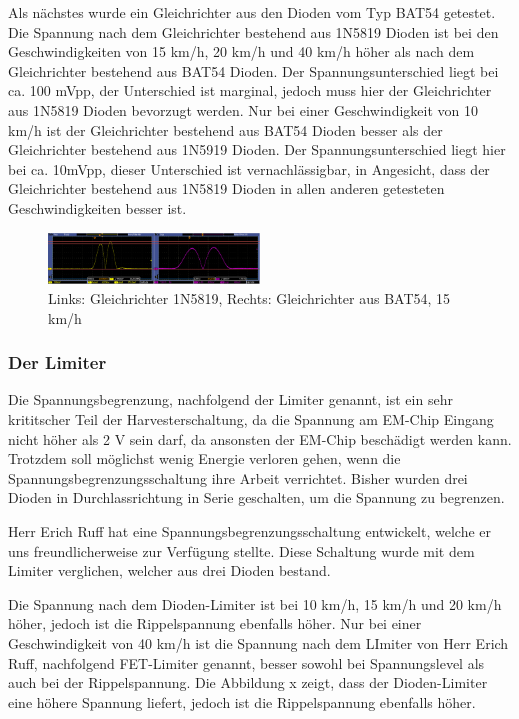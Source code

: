 Als nächstes wurde ein Gleichrichter aus den Dioden vom Typ BAT54 getestet. Die Spannung nach dem Gleichrichter bestehend aus 1N5819 Dioden ist bei den Geschwindigkeiten von 15 km/h, 20 km/h und 40 km/h höher als nach dem Gleichrichter bestehend aus BAT54 Dioden. Der Spannungsunterschied liegt bei ca. 100 mVpp, der Unterschied ist marginal, jedoch muss hier der Gleichrichter aus 1N5819 Dioden bevorzugt werden. Nur bei einer Geschwindigkeit von 10 km/h ist der Gleichrichter bestehend aus BAT54 Dioden besser als der Gleichrichter bestehend aus 1N5919 Dioden. Der Spannungsunterschied liegt hier bei ca. 10mVpp, dieser Unterschied ist vernachlässigbar, in Angesicht, dass der Gleichrichter bestehend aus 1N5819 Dioden in allen anderen getesteten Geschwindigkeiten besser ist.

\begin{figure}[ht]
    \includegraphics[width=0.5\textwidth]{3Vorgehen/imag/Messung_Optimierung_Gleichrichter_2.png}
    \caption{Links: Gleichrichter 1N5819, Rechts: Gleichrichter aus BAT54, 15 km/h}
    \label{messung_optimierung_gleichrichter_2} 
\end{figure}

\subsubsection{Der Limiter}

Die Spannungsbegrenzung, nachfolgend der Limiter genannt, ist ein sehr krititscher Teil der Harvesterschaltung, da die Spannung am EM-Chip Eingang nicht höher als 2 V sein darf, da ansonsten der EM-Chip beschädigt werden kann. Trotzdem soll möglichst wenig Energie verloren gehen, wenn die Spannungsbegrenzungsschaltung ihre Arbeit verrichtet. Bisher wurden drei Dioden in Durchlassrichtung in Serie geschalten, um die Spannung zu begrenzen.

Herr Erich Ruff hat eine Spannungsbegrenzungsschaltung entwickelt, welche er uns freundlicherweise zur Verfügung stellte. Diese Schaltung wurde mit dem Limiter verglichen, welcher aus drei Dioden bestand.

Die Spannung nach dem Dioden-Limiter ist bei 10 km/h, 15 km/h und 20 km/h höher, jedoch ist die Rippelspannung ebenfalls höher. Nur bei einer Geschwindigkeit von 40 km/h ist die Spannung nach dem LImiter von Herr Erich Ruff, nachfolgend FET-Limiter genannt, besser sowohl bei Spannungslevel als auch bei der Rippelspannung. Die Abbildung x zeigt, dass der Dioden-Limiter eine höhere Spannung liefert, jedoch ist die Rippelspannung ebenfalls höher.

